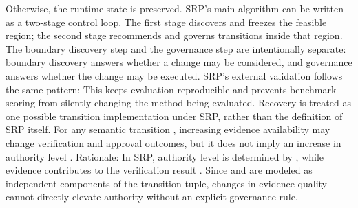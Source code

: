 {}Otherwise, the runtime state is preserved.\markdownRendererInterblockSeparator
{}
\markdownRendererSectionEnd \markdownRendererSectionBegin
{}\markdownRendererInterblockSeparator
{}SRP's main algorithm can be written as a two-stage control loop. The first stage discovers and freezes the feasible region; the second stage recommends and governs transitions inside that region.\markdownRendererInterblockSeparator
{}\markdownRendererInterblockSeparator
{}The boundary discovery step and the governance step are intentionally separate: boundary discovery answers whether a change may be considered, and governance answers whether the change may be executed.\markdownRendererParagraphSeparator
{}SRP's external validation follows the same pattern:\markdownRendererInterblockSeparator
{}\markdownRendererInterblockSeparator
{}This keeps evaluation reproducible and prevents benchmark scoring from silently changing the method being evaluated.\markdownRendererSoftLineBreak
{}Recovery is treated as one possible transition implementation under SRP, rather than the definition of SRP itself.\markdownRendererInterblockSeparator
{}
\markdownRendererSectionEnd \markdownRendererSectionBegin
{}\markdownRendererInterblockSeparator
{}For any semantic transition , increasing evidence availability  may change verification and approval outcomes, but it does not imply an increase in authority level .\markdownRendererParagraphSeparator
{}Rationale: In SRP, authority level is determined by , while evidence contributes to the verification result . Since  and  are modeled as independent components of the transition tuple, changes in evidence quality cannot directly elevate authority without an explicit governance rule.\markdownRendererInterblockSeparator
{}
\markdownRendererSectionEnd \markdownRendererSectionBegin
{}\markdownRendererInterblockSeparator
